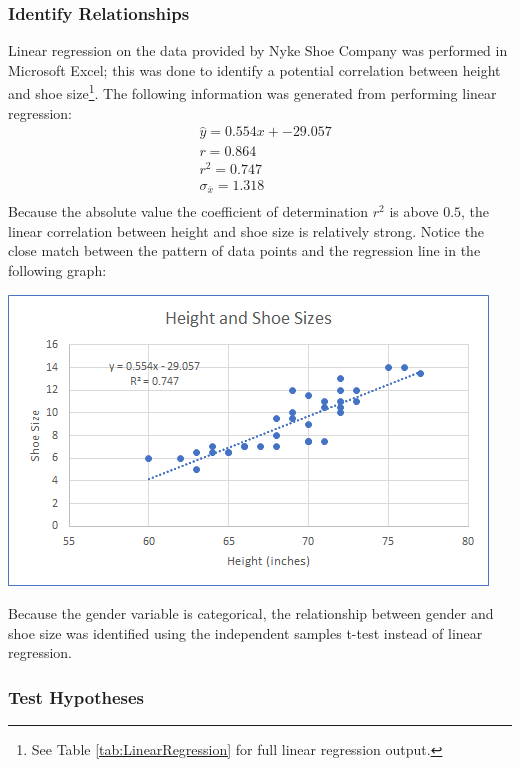 \subsubsection{Identify Relationships}
Linear regression on the data provided by Nyke Shoe Company was performed in Microsoft Excel; this was done to identify a potential correlation between height and shoe size\footnote{See Table \ref{tab:LinearRegression} for full linear regression output.}. The following information was generated from performing linear regression:
\begin{align*}
    &\hat{y} = 0.554x + -29.057 \\
    &r = 0.864\\
    &r^2 = 0.747\\
    &\sigma_{\overline{x}} = 1.318 \\
\end{align*}
Because the absolute value the coefficient of determination {$r^2$} is above {$0.5$}, the linear correlation between height and shoe size is relatively strong. Notice the close match between the pattern of data points and the regression line in the following graph:
\par
\begin{minipage}{\linewidth}
    \centering
    \includegraphics{graphics/HeightAndShoeSizesRegressionLine.png}
    \label{fig:RegressionLine}
\end{minipage}
\par
\vspace{5cm}
Because the gender variable is categorical, the relationship between gender and shoe size was identified using the independent samples t-test instead of linear regression.


\subsubsection{Test Hypotheses}